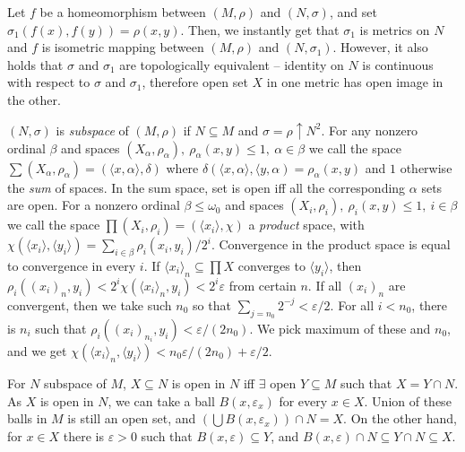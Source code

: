 Let $f$ be a homeomorphism between $(M,\rho)$ and $(N,\sigma)$, and set 
$\sigma_1(f(x),f(y)) = \rho(x,y)$. Then, we instantly get that $\sigma_1$ 
is metrics on $N$ and $f$ is isometric mapping between $(M,\rho)$ and 
$(N,\sigma_1)$. However, it also holds that $\sigma$ and $\sigma_1$ are 
topologically equivalent -- identity on $N$ is continuous with respect to 
$\sigma$ and $\sigma_1$, therefore open set $X$ in one metric has open 
image in the other.

\medskip

 $(N,\sigma)$ is {\it subspace} of $(M,\rho)$ if 
$N\subseteq M$ and $\sigma = \rho\uparrow N^2$. 
\smallskip
{}
For any nonzero ordinal $\beta$ and spaces $(X_\alpha,\rho_\alpha),\ 
\rho_\alpha(x,y)\leq 1,\ \alpha \in \beta$ we call the 
space $\sum (X_\alpha,\rho_\alpha) = (\langle x,\alpha\rangle, \delta)$ where 
$\delta(\langle x,\alpha\rangle,\langle y,\alpha) = \rho_\alpha(x,y)$ and 
$1$ otherwise the {\it sum} of spaces. In the sum space, set is open iff 
all the corresponding $\alpha$ sets are open.
\smallskip
{} For a nonzero ordinal $\beta \leq \omega_0$ and spaces 
$(X_i,\rho_i),\ \rho_i(x,y)\leq 1,\ i \in \beta$ 
we call the space $\prod (X_i,\rho_i) = (\langle x_i
\rangle, \chi)$ a {\it product} space, with $\chi(\langle x_i\rangle, 
\langle y_i \rangle) = \sum_{i\in \beta} \rho_i(x_i,y_i) / 2^i$.
Convergence in the product space is equal to convergence in every $i$.
If $\langle x_i\rangle_n \subseteq\prod X$ converges to $\langle y_i
\rangle$, then $\rho_i(
(x_i)_n, y_i) < 2^i \chi(\langle x_i\rangle_n, y_i) < 2^i \varepsilon$ from 
certain $n$. If all $(x_i)_n$ are convergent, then we take such $n_0$ so 
that $\sum_{j=n_0} 2^{-j} < \varepsilon/2$. For all $i < n_0$, there is 
$n_i$ such that $\rho_i((x_i)_{n_i},y_i) < \varepsilon/(2n_0)$. We pick maximum 
of these and $n_0$, and we get $\chi(\langle x_i\rangle_n, \langle y_i\rangle)
< n_0\varepsilon/(2n_0) + \varepsilon/2$.

\medskip
For $N$ subspace of $M$, $X\subseteq N$ is open in $N$ iff $\exists$ open 
$Y\subseteq M$ such that $X = Y\cap N$. As $X$ is open in $N$, we can take 
a ball $B(x,\varepsilon_x)$ for every $x\in X$. Union of these balls in 
$M$ is still an open set, and $(\bigcup B(x,\varepsilon_x)) \cap N = X$.
On the other hand, for $x\in X$ there is $\varepsilon >0$ such that 
$B(x,\varepsilon)\subseteq Y$, and $B(x,\varepsilon)\cap N \subseteq 
Y\cap N \subseteq X$.

